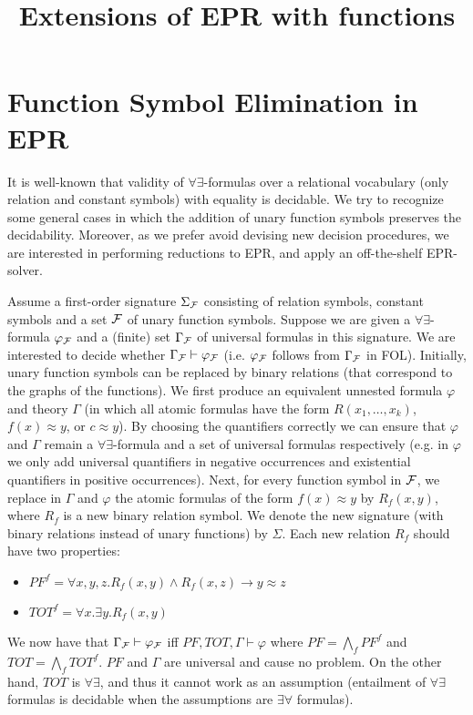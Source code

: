 \documentclass[11pt,a4paper,oneside]{article}
\title{Extensions of EPR with functions}
\theoremstyle{definition}
\theoremstyle{remark}
\newcommand{\vd}{\vdash}
\newcommand{\til}{,\dots,}
\newcommand{\fe}{\varphi}
\newcommand{\ra}{\rightarrow}
\begin{document}

\sloppy

\section{Function Symbol Elimination in EPR}

It is well-known that validity of $\forall\exists$-formulas over a relational vocabulary (only relation and constant symbols) with equality is decidable. We try to recognize some general cases in which the addition of unary function symbols preserves the decidability. Moreover, as we prefer avoid devising new decision procedures, we are interested in performing reductions to EPR, and apply an off-the-shelf EPR-solver.

Assume a first-order signature $\Sigma_{\cal F}$ consisting of relation symbols, constant symbols and a set ${\cal F}$ of unary function symbols.
Suppose we are given a $\forall\exists$-formula $\fe_{\cal F}$ and a (finite) set $\Gamma_{\cal F}$ of universal formulas
in this signature.
We are interested to decide whether $ \Gamma_{\cal F} \vdash \fe_{\cal F}$ (i.e. $\fe_{\cal F}$ follows from $\Gamma_{\cal F}$ in FOL).
Initially, unary function symbols can be replaced by binary relations (that correspond to the graphs of the functions). We first produce an equivalent unnested formula $\fe$ and theory $\Gamma$ (in which all atomic formulas have the form $R(x_1 \til x_k)$, $f(x) \approx y$, or $c\approx y$). By choosing the quantifiers correctly we can ensure that $\fe$ and $\Gamma$ remain a $\forall\exists$-formula and a set of universal formulas respectively (e.g. in $\fe$ we only add universal quantifiers in negative occurrences and existential quantifiers in positive occurrences). Next, for every function symbol in ${\cal F}$, we replace in $\Gamma$ and $\fe$ the atomic formulas of the form $f(x) \approx y$  by $R_f(x,y)$, where $R_f$ is a new binary relation symbol.
We denote the new signature (with binary relations instead of unary functions) by $\Sigma$.
 Each new relation $R_f$ should have two properties:
\begin{itemize}
\item $PF^f = \forall x,y,z. R_f(x,y) \land R_f(x,z) \ra y\approx z$ 
\item $TOT^f= \forall x. \exists y. R_f(x,y)$ 
\end{itemize}
We now have that $ \Gamma_{\cal F} \vdash \fe_{\cal F}$ iff 
$PF , TOT , \Gamma \vd \fe$
where
$PF=\bigwedge_f PF^f$ and $TOT=\bigwedge_f TOT^f$.
$PF$ and $\Gamma$ are universal and cause no problem.
On the other hand, $TOT$ is $\forall\exists$, and thus it cannot work as an assumption
(entailment of $\forall\exists$ formulas is decidable when the assumptions are  $\exists\forall$ formulas).
\end{document}
